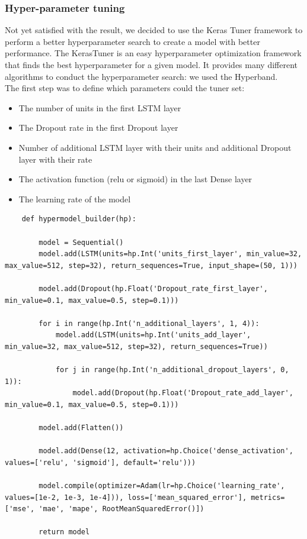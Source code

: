 \subsubsection{Hyper-parameter tuning}
Not yet satisfied with the result, we decided to use the Keras Tuner framework to perform a better hyperparameter search to create a model with better performance. The KerasTuner is an easy hyperparameter optimization framework that finds the best hyperparameter for a given model. It provides many different algorithms to conduct the hyperparameter search: we used the Hyperband. \\
The first step was to define which parameters could the tuner set:
\begin{itemize}
    \item The number of units in the first LSTM layer
    \item The Dropout rate in the first Dropout layer
    \item Number of additional LSTM layer with their units and additional Dropout layer with their rate
    \item The activation function (relu or sigmoid) in the last Dense layer
    \item The learning rate of the model
\end{itemize}
\begin{verbatim}
    def hypermodel_builder(hp):
    
        model = Sequential()
        model.add(LSTM(units=hp.Int('units_first_layer', min_value=32, max_value=512, step=32), return_sequences=True, input_shape=(50, 1)))
    
        model.add(Dropout(hp.Float('Dropout_rate_first_layer', min_value=0.1, max_value=0.5, step=0.1)))
    
        for i in range(hp.Int('n_additional_layers', 1, 4)):
            model.add(LSTM(units=hp.Int('units_add_layer', min_value=32, max_value=512, step=32), return_sequences=True))
            
            for j in range(hp.Int('n_additional_dropout_layers', 0, 1)):
                model.add(Dropout(hp.Float('Dropout_rate_add_layer', min_value=0.1, max_value=0.5, step=0.1)))
    
        model.add(Flatten())
    
        model.add(Dense(12, activation=hp.Choice('dense_activation', values=['relu', 'sigmoid'], default='relu')))
    
        model.compile(optimizer=Adam(lr=hp.Choice('learning_rate', values=[1e-2, 1e-3, 1e-4])), loss=['mean_squared_error'], metrics=['mse', 'mae', 'mape', RootMeanSquaredError()])
        
        return model
\end{verbatim}
